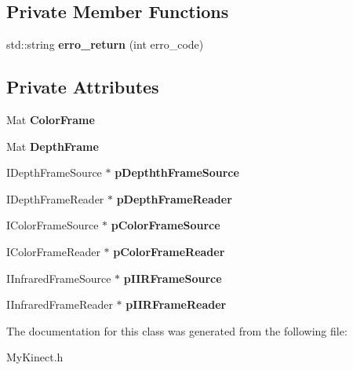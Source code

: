 \subsection*{Private Member Functions}
\begin{DoxyCompactItemize}
\item 
\mbox{\label{class_kinect_1_1_mykinect_a5c7bdc367953f4b9c4bb08ad477172ee}} 
std\+::string {\bfseries erro\+\_\+return} (int erro\+\_\+code)
\end{DoxyCompactItemize}
\subsection*{Private Attributes}
\begin{DoxyCompactItemize}
\item 
\mbox{\label{class_kinect_1_1_mykinect_a890c4099f95fd31eb9ea686c083819df}} 
Mat {\bfseries Color\+Frame}
\item 
\mbox{\label{class_kinect_1_1_mykinect_ad169384847443713dd5791ccaa5eb256}} 
Mat {\bfseries Depth\+Frame}
\item 
\mbox{\label{class_kinect_1_1_mykinect_ad4e0486c3fda83658c1ec3fcd3fa6b78}} 
I\+Depth\+Frame\+Source $\ast$ {\bfseries p\+Depthth\+Frame\+Source}
\item 
\mbox{\label{class_kinect_1_1_mykinect_a27dbf4b0246df4520fda00f0baab68fa}} 
I\+Depth\+Frame\+Reader $\ast$ {\bfseries p\+Depth\+Frame\+Reader}
\item 
\mbox{\label{class_kinect_1_1_mykinect_a1ac40a94c48bd9a332b54d59048fa907}} 
I\+Color\+Frame\+Source $\ast$ {\bfseries p\+Color\+Frame\+Source}
\item 
\mbox{\label{class_kinect_1_1_mykinect_aea46705cfed74053f44de463926741ff}} 
I\+Color\+Frame\+Reader $\ast$ {\bfseries p\+Color\+Frame\+Reader}
\item 
\mbox{\label{class_kinect_1_1_mykinect_aa432a481c8115b71e604a9a116c6a8c1}} 
I\+Infrared\+Frame\+Source $\ast$ {\bfseries p\+I\+I\+R\+Frame\+Source}
\item 
\mbox{\label{class_kinect_1_1_mykinect_a1ff6a08e1c9e498c62547afd49de32e0}} 
I\+Infrared\+Frame\+Reader $\ast$ {\bfseries p\+I\+I\+R\+Frame\+Reader}
\end{DoxyCompactItemize}


The documentation for this class was generated from the following file\+:\begin{DoxyCompactItemize}
\item 
My\+Kinect.\+h\end{DoxyCompactItemize}

